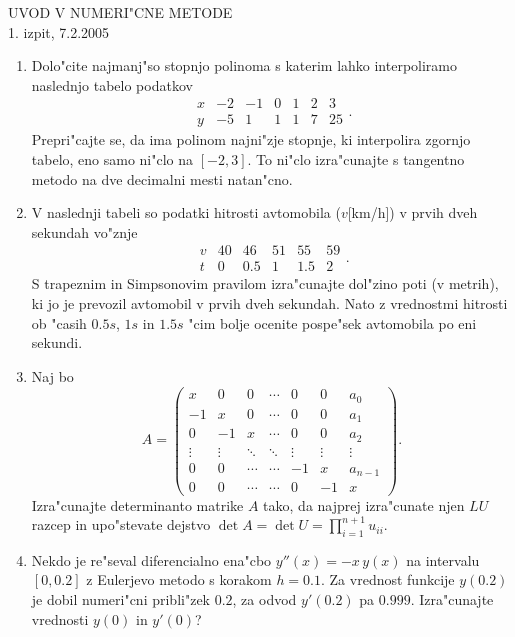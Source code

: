 \documentclass[12pt,a4paper]{article}
\begin{document}
\begin{center}
  {\large UVOD V NUMERI"CNE METODE\\
    1. izpit, 7.2.2005\\
    }
\end{center}
\vspace{2cm}

\begin{enumerate}

  \item Dolo"cite najmanj"so stopnjo polinoma s katerim
    lahko interpoliramo naslednjo tabelo podatkov
    $$\begin{array}{r|rrrrrr}
      x & -2 & -1 & 0 & 1 & 2 & 3\\ \hline
      y & -5 & 1  & 1 & 1 & 7 & 25
      \end{array}.
    $$
    Prepri"cajte se, da ima polinom najni"zje stopnje, ki interpolira
    zgornjo tabelo, eno samo ni"clo na $[-2,3]$. To ni"clo izra"cunajte s
    tangentno metodo na dve decimalni mesti natan"cno.
  
  \item V naslednji tabeli so podatki hitrosti avtomobila ($v$[km/h])
    v prvih dveh sekundah vo"znje
    $$\begin{array}{l|rrrrr}
    v & 40 & 46 & 51 & 55 & 59\\ \hline
    t & 0  & 0.5 & 1 & 1.5 & 2
    \end{array}.$$
    S trapeznim in Simpsonovim pravilom izra"cunajte dol"zino poti 
    (v me\-trih), ki jo je prevozil avtomobil v prvih dveh sekundah. Nato 
    z vrednostmi hitrosti ob "casih $0.5s$, $1s$ in $1.5s$ "cim bolje ocenite
    pospe"sek avtomobila po eni sekundi.

  \item Naj bo 
    $$A=\left(
      \begin{array}{ccccccc}
        x & 0 & 0 & \cdots & 0 & 0 & a_0\\
        -1& x & 0 & \cdots & 0 & 0 & a_1\\
        0 & -1& x & \cdots & 0 & 0 & a_2\\
        \vdots & \vdots & \ddots & \ddots & \vdots & \vdots & \vdots\\
        0 & 0 & \cdots & \cdots & -1 & x & a_{n-1}\\
        0 & 0 & \cdots & \cdots & 0 & -1 & x
      \end{array}\right) .
    $$
      Izra"cunajte determinanto matrike $A$ tako, da najprej
      izra"cunate njen $LU$ razcep in upo"stevate dejstvo
      $\det A=\det U=\prod_{i=1}^{n+1}u_{ii}$.
  \item Nekdo je re"seval diferencialno ena"cbo $y''(x)=-x\,y(x)$ 
    na intervalu $[0,0.2]$ z Eulerjevo metodo s korakom $h=0.1$.
    Za vrednost funkcije $y(0.2)$ je dobil numeri"cni pribli"zek $0.2$,
    za odvod $y'(0.2)$ pa $0.999$. Iz\-ra\-"cu\-najte vrednosti 
    $y(0)$ in $y'(0)$?
\end{enumerate}
\end{document}
